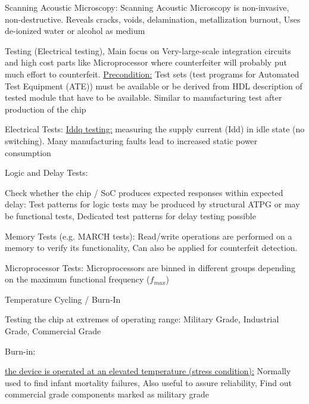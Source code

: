 \documentclass[landscape, a4paper]{article}
\begin{document}
\begin{minipage}[t]{0.2\linewidth}
\begin{betterlist}
\begin{betterlist}
\begin{betterlist}
				\item \alert{Scanning Acoustic Microscopy:} Scanning Acoustic Microscopy is non-invasive, non-destructive. Reveals cracks, voids, delamination, metallization burnout, Uses de-ionized water or alcohol as medium
			\end{betterlist}
			\item \alert{Testing (Electrical testing)}, Main focus on Very-large-scale integration circuits and high cost parts like Microprocessor where counterfeiter will probably put much effort to counterfeit. \underline{Precondition:} Test sets (test programs for Automated Test Equipment (ATE)) must be available or be derived from HDL description of tested module that have to be available. Similar to manufacturing test after production of the chip
			\begin{betterlist}
				\item \alert{Electrical Tests:} \underline{Iddq testing:} measuring the supply current (Idd) in idle state (no switching). Many manufacturing faults lead to increased static power consumption
				\item \alert{Logic and Delay Tests:}
				\begin{betterlist}
					\item \alert{Check whether the chip / SoC produces expected responses within expected delay:} Test patterns for logic tests may be produced by structural ATPG or may be functional tests, Dedicated test patterns for delay testing possible
					\item \alert{Memory Tests (e.g. MARCH tests):} Read/write operations are performed on a memory to verify its functionality, Can also be applied for counterfeit detection.
					\item \alert{Microprocessor Tests:} Microprocessors are binned in different groups depending on the maximum functional frequency ($f_{max}$)
				\end{betterlist}
				\item \alert{Temperature Cycling / Burn-In}
				\begin{betterlist}
					\item \alert{Testing the chip at extremes of operating range:} Military Grade, Industrial Grade, Commercial Grade
					\item \alert{Burn-in:}
					\begin{betterlist}
						\item \underline{the device is operated at an elevated temperature (stress condition):} Normally used to find infant mortality failures, Also useful to assure reliability, Find out commercial grade components marked as military grade

\end{betterlist}
\end{betterlist}
\end{betterlist}
\end{betterlist}
\end{betterlist}
\end{minipage}
\end{document}
